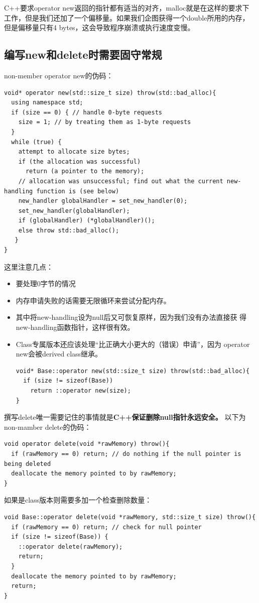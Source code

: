 C++要求operator new返回的指针都有适当的对齐，malloc就是在这样的要求下
工作，但是我们还加了一个偏移量。如果我们企图获得一个double所用的内存，
但是偏移量只有4 bytes，这会导致程序崩溃或执行速度变慢。

\subsection{编写new和delete时需要固守常规}
\label{sec:Item-51}

non-member operator new的伪码：
\begin{verbatim}
void* operator new(std::size_t size) throw(std::bad_alloc){
  using namespace std; 
  if (size == 0) { // handle 0-byte requests
    size = 1; // by treating them as 1-byte requests
  } 
  while (true) {
    attempt to allocate size bytes;
    if (the allocation was successful)
      return (a pointer to the memory);
    // allocation was unsuccessful; find out what the current new-handling function is (see below)
    new_handler globalHandler = set_new_handler(0);
    set_new_handler(globalHandler);
    if (globalHandler) (*globalHandler)();
    else throw std::bad_alloc();
   }
}
\end{verbatim}
这里注意几点：
\begin{itemize}
\item 要处理0字节的情况
\item 内存申请失败的话需要无限循环来尝试分配内存。
\item 其中将new-handling设为null后又可恢复原样，因为我们没有办法直接获
  得new-handling函数指针，这样很有效。
\item Class专属版本还应该处理“比正确大小更大的（错误）申请”，因为
  operator new会被derived class继承。
\begin{verbatim}
void* Base::operator new(std::size_t size) throw(std::bad_alloc){
  if (size != sizeof(Base))
    return ::operator new(size);
}
\end{verbatim}
\end{itemize}

撰写delete唯一需要记住的事情就是\textbf{C++保证删除null指针永远安全。}
以下为non-mamber delete的伪码：
\begin{verbatim}
void operator delete(void *rawMemory) throw(){
  if (rawMemory == 0) return; // do nothing if the null pointer is being deleted
  deallocate the memory pointed to by rawMemory;
}
\end{verbatim}

如果是class版本则需要多加一个检查删除数量：
\begin{verbatim}
void Base::operator delete(void *rawMemory, std::size_t size) throw(){
  if (rawMemory == 0) return; // check for null pointer
  if (size != sizeof(Base)) {
    ::operator delete(rawMemory); 
    return; 
  }
  deallocate the memory pointed to by rawMemory;
  return;
}
\end{verbatim}

